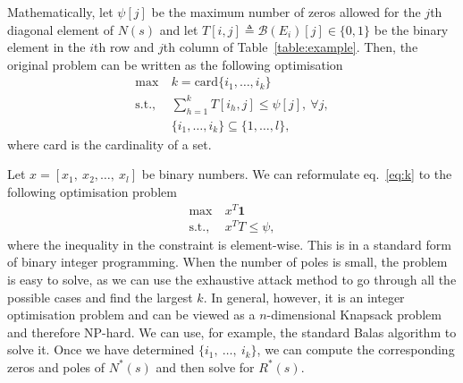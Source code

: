 \documentclass[twocolumn,12pt]{autart}
\theoremstyle{plain}
\newcommand{\vect}[1]{\boldsymbol{#1}}
\begin{document}
Mathematically, let $\psi[j]$ be the maximum number of zeros allowed for the $j$th diagonal element of $N(s)$ and let $T[i,j]\triangleq \mathcal{B}(E_i)[j]\in\{0,1\}$ be the binary element in the
$i$th row and $j$th column of Table~\ref{table:example}. Then, the original problem can be written as the following optimisation
\begin{align}
\max~ &k=\text{card} \{i_1,\ldots,i_k\} \label{eq:k}\\
\text{s.t.},~&\sum_{h=1}^k  T[i_h,j] \le \psi[j],~\forall j, \nonumber \\
& \{i_1,\ldots,i_k\}\subseteq \{1,\ldots,l\},\nonumber
\end{align}
where card is the cardinality of a set. 





Let $x=[x_1,~x_2,\ldots,~ x_l]$ be binary numbers. We can reformulate eq.~\eqref{eq:k} to the following optimisation problem
\begin{align}
\max ~&x^T \vect{1}\\
\text{s.t.},~&x^T T \le \psi \nonumber,
\end{align}
where the inequality in the constraint is element-wise. This is in a standard form of binary integer programming. When the number of poles is small, the problem is easy to solve, as we can use the exhaustive attack method to go through all the possible cases and find the largest $k$. In general, however, it is an integer optimisation problem and can be viewed as a $n$-dimensional Knapsack problem and therefore NP-hard. We can use, for example, the standard Balas algorithm \cite{balas} to solve it. Once we have determined  $\{i_1,~\ldots,~i_k\}$, we can compute the corresponding zeros and poles of $N^*(s)$ and then solve for  $R^*(s)$.
\end{document}
